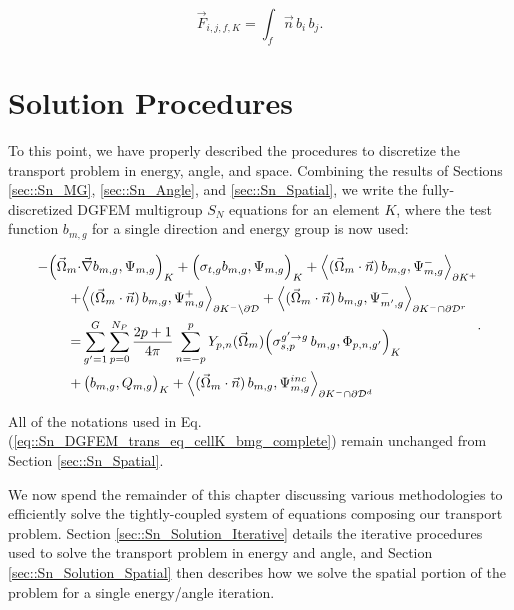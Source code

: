\begin{equation}
\label{eq::Sn_streaming_matrix_entry}
\vec{{ F}}_{i,j,f,K} =  \int_f \vec{n} \, b_i \, b_j .
\end{equation}

\section{Solution Procedures}
\label{sec::Sn_Solution}

To this point, we have properly described the procedures to discretize the transport problem in energy, angle, and space. Combining the results of Sections \ref{sec::Sn_MG}, \ref{sec::Sn_Angle}, and \ref{sec::Sn_Spatial}, we write the fully-discretized DGFEM multigroup $S_N$ equations for an element $K$, where the test function $b_{m,g}$ for a single direction and energy group is now used:

\begin{equation}
\label{eq::Sn_DGFEM_trans_eq_cellK_bmg_complete}
\begin{aligned}
-  \Big( \vec{\Omega}_m \cdot  & \vec{\nabla} b_{m,g}, \Psi_{m,g} \Big)_{K}   + \Big(  \sigma_{t,g} b_{m,g} ,   \Psi_{m,g} \Big)_{K} +  \Big< ( \vec{\Omega}_m \cdot \vec{n} ) \, b_{m,g}, {\Psi}_{m,g}^{-}  \Big>_{\partial K^+}  \\
  + & \Big< ( \vec{\Omega}_m \cdot \vec{n} ) \, b_{m,g}, {\Psi}_{m,g}^{+}  \Big>_{\partial K^- \backslash \partial \mathcal{D}}  + \Big< ( \vec{\Omega}_m \cdot \vec{n} ) \, b_{m,g}, {\Psi}^{-}_{m',g}  \Big>_{\partial K^- \cap \partial \mathcal{D}^r}  \\
= & \sum\displaylimits_{g'=1}^G \sum_{p=0}^{N_P} \frac{2p + 1}{4 \pi} \sum_{n=-p}^{p}   Y_{p,n} (  \vec{\Omega}_m )  \Big( \sigma_{s,p}^{g' \rightarrow g} \, b_{m,g},  \Phi_{p,n,g'} \Big)_{K}  \\
+ & \left(  b_{m,g} ,   Q_{m,g} \right)_{K} + \Big< ( \vec{\Omega}_m \cdot \vec{n} ) \, b_{m,g}, {\Psi}_{m,g}^{inc}  \Big>_{\partial K^- \cap \partial \mathcal{D}^d}
\end{aligned} .
\end{equation} 

\noindent All of the notations used in Eq. (\ref{eq::Sn_DGFEM_trans_eq_cellK_bmg_complete}) remain unchanged from Section \ref{sec::Sn_Spatial}.

We now spend the remainder of this chapter discussing various methodologies to efficiently solve the tightly-coupled system of equations composing our transport problem. Section \ref{sec::Sn_Solution_Iterative} details the iterative procedures used to solve the transport problem in energy and angle, and Section \ref{sec::Sn_Solution_Spatial} then describes how we solve the spatial portion of the problem for a single energy/angle iteration.

